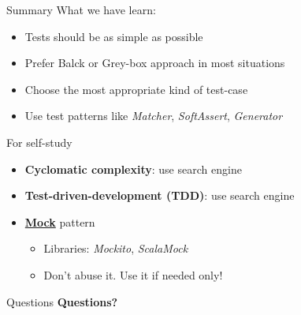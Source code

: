 \documentclass[aspectratio=169]{beamer}
\begin{document}
\begin{frame}{Summary}
  What we have learn:
  \begin{itemize}
    \item Tests should be as simple as possible
    \item Prefer Balck or Grey-box approach in most situations
    \item Choose the most appropriate kind of test-case
    \item Use test patterns like \textit{Matcher}, \textit{SoftAssert}, \textit{Generator}
  \end{itemize}
\end{frame}

\begin{frame}{For self-study}
  \begin{itemize}
    \item \textbf{Cyclomatic complexity}: use search engine
    \item \textbf{Test-driven-development (TDD)}: use search engine
    \item \textbf{\underline{Mock}} pattern
      \begin{itemize}
        \item Libraries: \textit{Mockito}, \textit{ScalaMock}
        \item Don't abuse it. Use it if needed only!
      \end{itemize}
  \end{itemize}
\end{frame}

\begin{frame}{Questions}
  \centering\Large \textbf{Questions?}
\end{frame}
\end{document}
